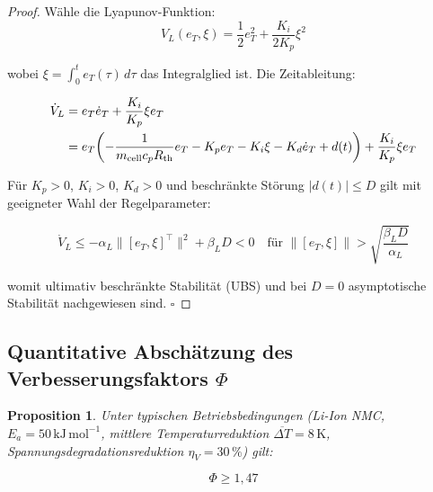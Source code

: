 ﻿\documentclass[12pt,a4paper]{article}
\newtheorem{proposition}[theorem]{Proposition}
\begin{document}
	\begin{proof}
		Wähle die Lyapunov-Funktion:
		\begin{equation}
			V_L(e_T, \xi) = \frac{1}{2}e_T^2 + \frac{K_i}{2K_p}\xi^2
		\end{equation}
		
		wobei $\xi = \int_0^t e_T(\tau)\,d\tau$ das Integralglied ist. Die Zeitableitung:
		
		\begin{align}
			\dot{V}_L &= e_T \dot{e}_T + \frac{K_i}{K_p}\xi e_T \notag\\
			&= e_T\!\left(-\frac{1}{m_\mathrm{cell}c_p R_\mathrm{th}} e_T
			- K_p e_T - K_i \xi - K_d \dot{e}_T + d(t)\right) + \frac{K_i}{K_p}\xi e_T
		\end{align}
		
		Für $K_p > 0$, $K_i > 0$, $K_d > 0$ und beschränkte Störung $|d(t)| \leq D$
		gilt mit geeigneter Wahl der Regelparameter:
		
		\begin{equation}
			\dot{V}_L \leq -\alpha_L \|[e_T, \xi]^\top\|^2 + \beta_L D < 0
			\quad \text{für } \|[e_T, \xi]\| > \sqrt{\frac{\beta_L D}{\alpha_L}}
		\end{equation}
		
		womit ultimativ beschränkte Stabilität (UBS) und bei $D = 0$ asymptotische
		Stabilität nachgewiesen sind. \hfill$\square$
	\end{proof}
	
	\subsection{Quantitative Abschätzung des Verbesserungsfaktors $\Phi$}
	
	\begin{proposition}
		\label{prop:phi_bound}
		Unter typischen Betriebsbedingungen (Li-Ion NMC, $E_a = 50\,\mathrm{kJ\,mol^{-1}}$,
		mittlere Temperaturreduktion $\overline{\Delta T} = 8\,\mathrm{K}$,
		Spannungsdegradationsreduktion $\eta_V = 30\,\%$) gilt:
		
		\begin{equation}
			\Phi \geq 1{,}47
		\end{equation}
	\end{proposition}
	
\end{document}
